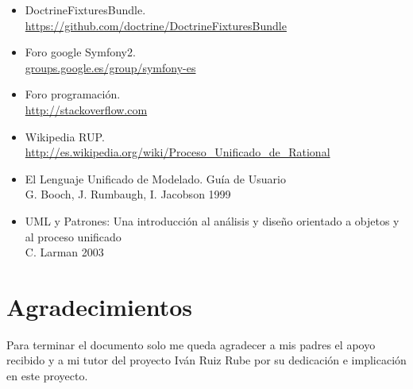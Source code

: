 \documentclass[a4paper,12pt]{article}
\begin{document}
\begin{itemize}
\item DoctrineFixturesBundle. \\\url{https://github.com/doctrine/DoctrineFixturesBundle}
\item Foro google Symfony2. \\\url{groups.google.es/group/symfony-es}
\item Foro programación. \\\url{http://stackoverflow.com}
\item Wikipedia RUP. \\\url{http://es.wikipedia.org/wiki/Proceso_Unificado_de_Rational}
\item El Lenguaje Unificado de Modelado. Guía de Usuario \\G. Booch, J. Rumbaugh, I. Jacobson 1999
\item UML y Patrones: Una introducción al análisis y diseño orientado a objetos y al proceso unificado \\C. Larman 2003
\end{itemize}

\section{\fontsize{12}{1}\selectfont Agradecimientos}
\noindent Para terminar el documento solo me queda agradecer a mis padres el apoyo recibido y a mi tutor del proyecto Iván Ruiz Rube por su dedicación e implicación en este proyecto. 
  
\end{document}
